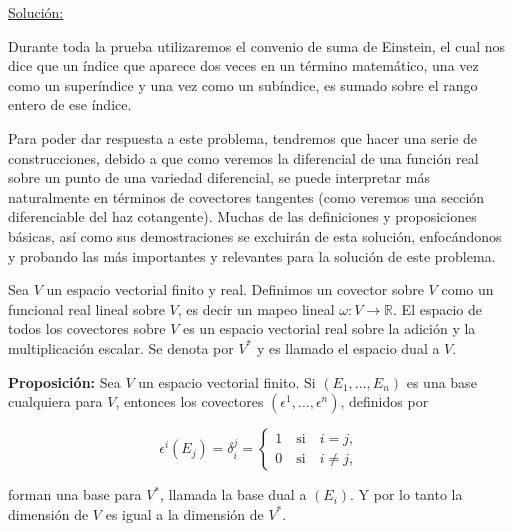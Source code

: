 \documentclass[a4paper,10pt]{article}
\numberwithin{equation}{section}
\newcommand{\proposicion}{\textbf{Proposición: }}
\begin{document}
\vspace{.3cm}

\underline{Solución:} \vspace{.3cm}

Durante toda la prueba utilizaremos el convenio de suma de Einstein, el cual nos dice 
que un índice que aparece dos veces en un término matemático, una vez como un 
superíndice y una vez como un subíndice, es sumado sobre el rango entero de ese 
índice. 

\vspace{.3cm}

Para poder dar respuesta a este problema, tendremos que hacer una serie de construcciones, 
debido a que como veremos la diferencial de una función real sobre un punto de 
una variedad diferencial, se puede interpretar más naturalmente en términos de 
covectores tangentes (como veremos una sección diferenciable del haz cotangente). Muchas 
de las definiciones y proposiciones básicas, así como sus demostraciones se excluirán de esta solución, enfocándonos 
y probando las más importantes y relevantes para la solución de este problema.

\vspace{.3cm}

Sea $V$ un espacio vectorial finito y real. Definimos un covector sobre $V$ como 
un funcional real lineal sobre $V$, es decir un mapeo lineal $ \omega: V \rightarrow 
\mathbb{R}$. El espacio de todos los covectores sobre $V$ es un espacio vectorial 
real sobre la adición y la multiplicación escalar. Se denota por $V^*$ y es llamado 
el espacio dual a $V$.

\vspace{.3cm}

\proposicion Sea $V$ un espacio vectorial finito. Si $(E_1,\dots,E_n)$ es una base 
cualquiera para $V$, entonces los covectores $(\epsilon^1,\dots,\epsilon^n)$, 
definidos por 

\begin{equation}
 \epsilon^i(E_j) = \delta_i^j = \begin{cases}
                                 1 \quad \text{si} \quad i=j, \\
                                 0 \quad \text{si} \quad i\ne j,
                                \end{cases}
\end{equation}

forman una base para $V^*$, llamada la base dual a $(E_i)$. Y por lo tanto la 
dimensión de $V$ es igual a la dimensión de $V^*$.
\end{document}
